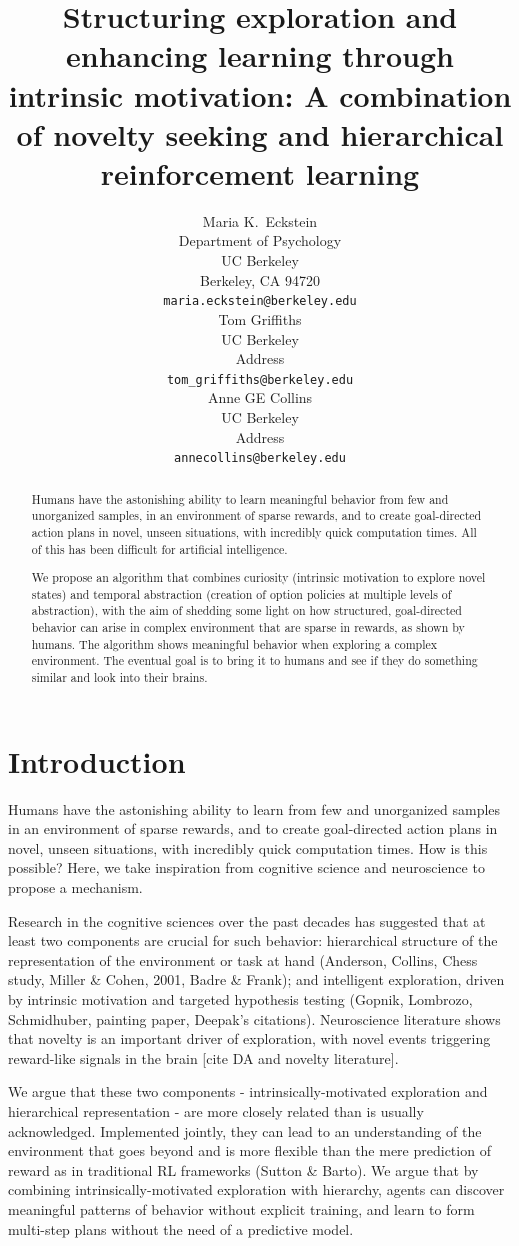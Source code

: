 \documentclass{article}
\title{Structuring exploration and enhancing learning through intrinsic motivation: A combination of novelty seeking and hierarchical reinforcement learning}
\author{
  Maria K.~Eckstein \\
  Department of Psychology \\
  UC Berkeley \\
  Berkeley, CA 94720 \\
  \texttt{maria.eckstein@berkeley.edu} \\  
  \And
  Tom Griffiths \\
  UC Berkeley \\
  Address \\
  \texttt{tom_griffiths@berkeley.edu} \\
  \And
  Anne GE Collins \\
  UC Berkeley \\
  Address \\
  \texttt{annecollins@berkeley.edu} \\
}
\begin{document}
\maketitle

\begin{abstract}
    Humans have the astonishing ability to learn meaningful behavior from few and unorganized samples, in an environment of sparse rewards, and to create goal-directed action plans in novel, unseen situations, with incredibly quick computation times. All of this has been difficult for artificial intelligence. 


  We propose an algorithm that combines curiosity (intrinsic motivation to explore novel states) and temporal abstraction (creation of option policies at multiple levels of abstraction), with the aim of shedding some light on how structured, goal-directed behavior can arise in complex environment that are sparse in rewards, as shown by humans. The algorithm shows meaningful behavior when exploring a complex environment. The eventual goal is to bring it to humans and see if they do something similar and look into their brains.
\end{abstract}


\section{Introduction}

Humans have the astonishing ability to learn from few and unorganized samples in an environment of sparse rewards, and to create goal-directed action plans in novel, unseen situations, with incredibly quick computation times. How is this possible? Here, we take inspiration from cognitive science and neuroscience to propose a mechanism.

Research in the cognitive sciences over the past decades has suggested that at least two components are crucial for such behavior: hierarchical structure of the representation of the environment or task at hand (Anderson, Collins, Chess study, Miller \& Cohen, 2001, Badre \& Frank); and intelligent exploration, driven by intrinsic motivation and targeted hypothesis testing (Gopnik, Lombrozo, Schmidhuber, painting paper, Deepak's citations). Neuroscience literature shows that novelty is an important driver of exploration, with novel events triggering reward-like signals in the brain [cite DA and novelty literature].

We argue that these two components - intrinsically-motivated exploration and hierarchical representation - are more closely related than is usually acknowledged. Implemented jointly, they can lead to an understanding of the environment that goes beyond and is more flexible than the mere prediction of reward as in traditional RL frameworks (Sutton \& Barto). We argue that by combining intrinsically-motivated exploration with hierarchy, agents can discover meaningful patterns of behavior without explicit training, and learn to form multi-step plans without the need of a predictive model.
\end{document}
